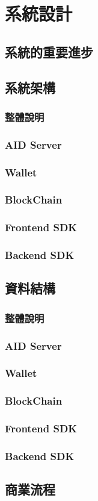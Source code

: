 
\chapter{系統設計}

\section{系統的重要進步}

\section{系統架構}
\subsection{整體說明}
\subsection{AID Server}
\subsection{Wallet}
\subsection{BlockChain}
\subsection{Frontend SDK}
\subsection{Backend SDK}

\section{資料結構}
\subsection{整體說明}
\subsection{AID Server}
\subsection{Wallet}
\subsection{BlockChain}
\subsection{Frontend SDK}
\subsection{Backend SDK}

\section{商業流程}